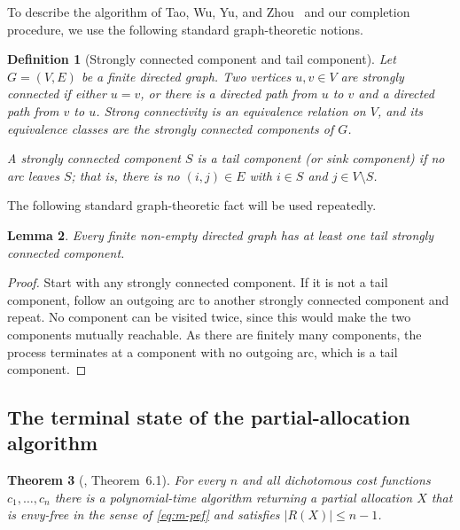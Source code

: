 \documentclass[sigconf,anonymous]{aamas}
\newcommand{\cost}{c}
\newcommand{\abs}[1]{\left\lvert#1\right\rvert}
\theoremstyle{acmplain}
\newtheorem{theorem}{Theorem}[section]
\newtheorem{lemma}[theorem]{Lemma}
\theoremstyle{acmdefinition}
\newtheorem{definition}[theorem]{Definition}
\theoremstyle{acmplain}
\begin{document}
To describe the algorithm of Tao, Wu, Yu, and Zhou~\cite{tao2025existence} and our completion procedure, we use the following standard graph-theoretic notions.

\begin{definition}[Strongly connected component and tail component]
\label{def:scc}
Let $G=(V,E)$ be a finite directed graph. Two vertices \(u,v\in V\) are \emph{strongly connected} if either \(u=v\), or there is a directed path from \(u\) to \(v\) and a directed path from \(v\) to \(u\). Strong connectivity is an equivalence relation on $V$, and its equivalence classes are the \emph{strongly connected components} of $G$.

A strongly connected component $S$ is a \emph{tail component} (or \emph{sink component}) if no arc leaves $S$; that is, there is no $(i,j)\in E$ with $i\in S$ and $j\in V\setminus S$.
\end{definition}

The following standard graph-theoretic fact will be used repeatedly.

\begin{lemma} \label{lem:tail-scc-exists} Every finite non-empty directed graph has at least one tail strongly connected component.
\end{lemma}
\begin{proof}
Start with any strongly connected component. If it is not a tail component, follow an outgoing arc to another strongly connected component and repeat. No component can be visited twice, since this would make the two components mutually reachable. As there are finitely many components, the process terminates at a component with no outgoing arc, which is a tail component.
\end{proof}


\subsection{The terminal state of the partial-allocation algorithm}
\label{sec:m-terminal}

\begin{theorem}[\cite{tao2025existence}, Theorem~6.1] \label{thm:m-twyz} For every $n$ and all dichotomous cost functions $\cost_1,\dots,\cost_n$ there is a polynomial-time algorithm returning a partial allocation $X$ that is envy-free in the sense of \eqref{eq:m-pef} and satisfies $\abs{R(X)} \le n-1$. \end{theorem}
\end{document}
